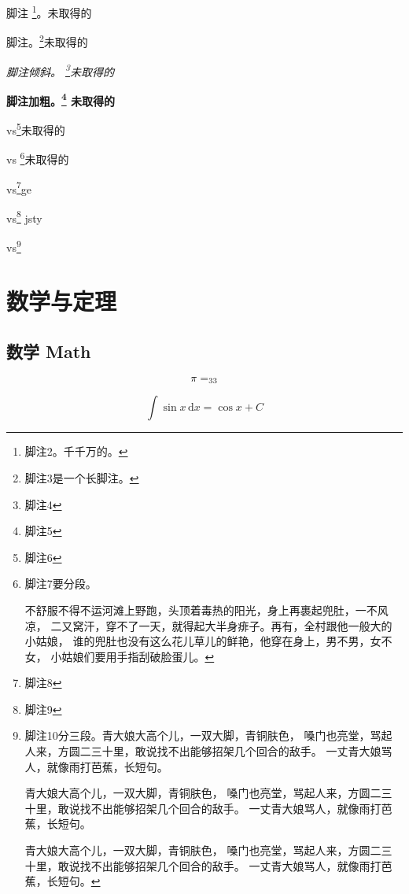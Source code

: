 脚注 \footnote{脚注2。千千万的。}。未取得的

脚注。\footnote{脚注3是一个长脚注。\zhlipsum*[2]}未取得的

\textit{脚注倾斜。 \footnote{脚注4}未取得的}

\textbf{脚注加粗。\footnote{脚注5} 未取得的}

vs\footnote{脚注6}未取得的

vs \footnote{脚注7要分段。\par 不舒服不得不运河滩上野跑，头顶着毒热的阳光，身上再裹起兜肚，一不风凉，
二又窝汗，穿不了一天，就得起大半身痱子。再有，全村跟他一般大的小姑娘，
谁的兜肚也没有这么花儿草儿的鲜艳，他穿在身上，男不男，女不女，
小姑娘们要用手指刮破脸蛋儿。}未取得的

vs\footnote{脚注8}ge

vs\footnote{脚注9} jsty

vs\footnote{脚注10分三段。青大娘大高个儿，一双大脚，青铜肤色，
嗓门也亮堂，骂起人来，方圆二三十里，敢说找不出能够招架几个回合的敌手。
一丈青大娘骂人，就像雨打芭蕉，长短句。\par
青大娘大高个儿，一双大脚，青铜肤色，
嗓门也亮堂，骂起人来，方圆二三十里，敢说找不出能够招架几个回合的敌手。
一丈青大娘骂人，就像雨打芭蕉，长短句。 \par
青大娘大高个儿，一双大脚，青铜肤色，
嗓门也亮堂，骂起人来，方圆二三十里，敢说找不出能够招架几个回合的敌手。
一丈青大娘骂人，就像雨打芭蕉，长短句。}

\chapter{数学与定理}
\section{数学 Math}
\[\pi=\sb{33}\]

\[
  \int\sin x\,\mathrm{d}x=\cos x + C
\]



